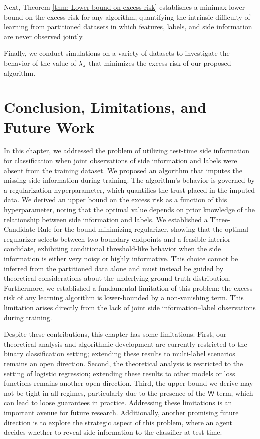 Next, Theorem \ref{thm: Lower bound on excess risk} establishes a minimax lower bound on the excess risk for any algorithm, quantifying the intrinsic difficulty of learning from partitioned datasets in which features, labels, and side information are never observed jointly. 

Finally, we conduct simulations on a variety of datasets to investigate the behavior of the value of $\lambda_z$ that minimizes the excess risk of our proposed algorithm.




%

\section{Conclusion, Limitations, and Future Work}
In this chapter, we addressed the problem of utilizing test-time side information for classification when joint observations of side information and labels were absent from the training dataset. We proposed an algorithm that imputes the missing side information during training. The algorithm's behavior is governed by a regularization hyperparameter, which quantifies the trust placed in the imputed data. We derived an upper bound on the excess risk as a function of this hyperparameter, noting that the optimal value depends on prior knowledge of the relationship between side information and labels. We established a Three-Candidate Rule for the bound-minimizing regularizer, showing that the optimal regularizer selects between two boundary endpoints and a feasible interior candidate, exhibiting conditional threshold-like behavior when the side information is either very noisy or highly informative.
This choice cannot be inferred from the partitioned data alone and must instead be guided by theoretical considerations about the underlying ground-truth distribution.
Furthermore, we established a fundamental limitation of this problem: the excess risk of any learning algorithm is lower-bounded by a non-vanishing term. This limitation arises directly from the lack of joint side information–label observations during training. 

Despite these contributions, this chapter has some limitations. First, our theoretical analysis and algorithmic development are currently restricted to the binary classification setting; extending these results to multi-label scenarios remains an open direction. Second, the theoretical analysis is restricted to the setting of logistic regression; extending these results to other models or loss functions remains another open direction. Third, the upper bound we derive may not be tight in all regimes, particularly due to the presence of the $\mathsf{W}$ term, which can lead to loose guarantees in practice. Addressing these limitations is an important avenue for future research. Additionally, another promising future direction is to explore the strategic aspect of this problem, where an agent decides whether to reveal side information to the classifier at test time.

